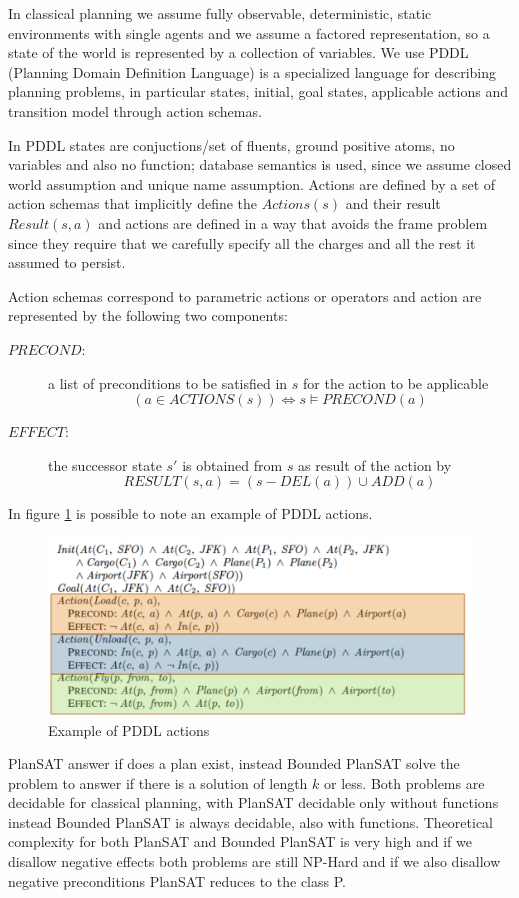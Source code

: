 In classical planning we assume fully observable, deterministic, static environments with
single agents and we assume a factored representation, so a state of the world is represented
by a collection of variables.\newline
We use PDDL (Planning Domain Definition Language) is a specialized language for describing 
planning problems, in particular states, initial, goal states, applicable actions and 
transition model through action schemas.

In PDDL states are conjuctions/set of fluents, ground positive atoms, no variables and also
no function; database semantics is used, since we assume closed world assumption and unique
name assumption.\newline
Actions are defined by a set of action schemas that implicitly define the $Actions(s)$ and 
their result $Result(s, a)$ and actions are defined in a way that avoids the frame problem
since they require that we carefully specify all the charges and all the rest it assumed
to persist.

Action schemas correspond to parametric actions or operators and action are represented 
by the following two components:
\begin{description}
   \item [$PRECOND$: ] a list of preconditions to be satisfied in $s$ for the action to be 
	               applicable
		       \[ (a \in ACTIONS(s)) \iff s \models PRECOND(a) \]
   \item [$EFFECT$: ] the successor state $s'$ is obtained from $s$ as result of the action by
	      \[ RESULT(s, a) = (s - DEL(a)) \cup ADD(a) \]
\end{description}
In figure \ref{img:PDDLExample} is possible to note an example of PDDL actions.

\begin{figure}
	\includegraphics[width=\textwidth]{Images/PDDLEx}
	\caption{Example of PDDL actions}
	\label{img:PDDLExample}
\end{figure}
PlanSAT answer if does a plan exist, instead Bounded PlanSAT solve the problem to answer if
there is a solution of length $k$ or less.\newline
Both problems are decidable for classical planning, with PlanSAT decidable only without functions
instead Bounded PlanSAT is always decidable, also with functions.\newline
Theoretical complexity for both PlanSAT and Bounded PlanSAT is very high and if we disallow 
negative effects both problems are still NP-Hard and if we also disallow negative preconditions
PlanSAT reduces to the class P.

